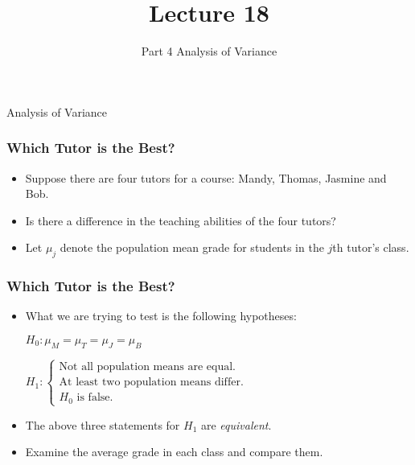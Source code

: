 \documentclass[12pt]{beamer}
\title[ECON2843]{Lecture 18}
\subtitle{Part 4 Analysis of Variance}
\date{}
\begin{document}
	\begin{frame}
		\titlepage
	\end{frame}
	\begin{frame}
		\vspace{1cm}
		\centering
		{\color{blue}\large Analysis of Variance}
	\end{frame}

	\begin{frame}
		\frametitle{Which Tutor is the Best?}
		
		\begin{itemize}[label={\color{blue}$\blacktriangleright$}]
			\item Suppose there are four tutors for a course:
			Mandy, Thomas, Jasmine and Bob.
			\item Is there a difference in the teaching abilities of the
			four tutors?
			\item Let $\mu_j$ denote the population mean grade for
			students in the $j$th tutor's class.
		\end{itemize}
		
	\end{frame}
\begin{frame}
	\frametitle{Which Tutor is the Best?}
	
	\begin{itemize}[label={\color{blue}$\blacktriangleright$}]
		\item What we are trying to test is the following hypotheses:
		
		\vspace{0.5em}
		$H_0 : \mu_M = \mu_T = \mu_J = \mu_B$
		
		\vspace{0.5em}
		$H_1 : \begin{cases}
			\text{Not all population means are equal.} \\
			\text{At least two population means differ.} \\
			H_0 \text{ is false.}
		\end{cases}$
		
		\item The above three statements for $H_1$ are \textit{equivalent}.
		
		\item Examine the average grade in each class and compare them.
	\end{itemize}
	
\end{frame}
\end{document}

